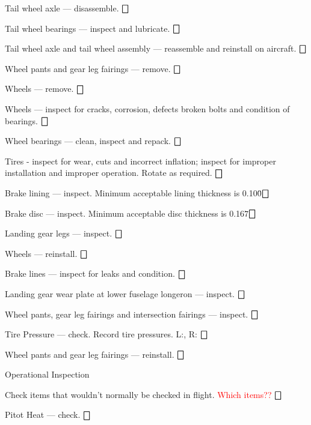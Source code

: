 \begin{enumerate*}
\begin{enumerate*}
\begin{enumerate*}
		  \item Tail wheel axle --- disassemble. \dotfill $\bigbox$
		  \item Tail wheel bearings --- inspect and lubricate. \dotfill $\bigbox$
		  \item Tail wheel axle and tail wheel assembly --- reassemble and reinstall on aircraft. \dotfill $\bigbox$
	  \end{enumerate*}
		\item Wheel pants and gear leg fairings --- remove. \dotfill $\bigbox$
		\item Wheels --- remove. \dotfill $\bigbox$
		\item Wheels --- inspect for cracks, corrosion, defects broken bolts and condition of bearings. \dotfill $\bigbox$
		\item Wheel bearings --- clean, inspect and repack. \dotfill $\bigbox$
		\item Tires - inspect for wear, cuts and incorrect inflation; inspect for improper installation and improper operation. Rotate as required. \dotfill $\bigbox$
		\item Brake lining --- inspect. Minimum acceptable lining thickness is 0.100\" \dotfill $\bigbox$
		\item Brake disc --- inspect. Minimum acceptable disc thickness is 0.167\" \dotfill $\bigbox$
		\item Landing gear legs --- inspect. \dotfill $\bigbox$
		\item Wheels --- reinstall. \dotfill $\bigbox$
		\item Brake lines --- inspect for leaks and condition. \dotfill $\bigbox$
		\item Landing gear wear plate at lower fuselage longeron --- inspect. \dotfill $\bigbox$
		\item Wheel pants, gear leg fairings and intersection fairings --- inspect. \dotfill $\bigbox$
		\item Tire Pressure --- check. Record tire pressures. L:\underline{\makebox[0.5in][l]{}}, R:\underline{\makebox[0.5in][l]{}} \dotfill $\bigbox$
		\item Wheel pants and gear leg fairings --- reinstall. \dotfill $\bigbox$
	\end{enumerate*}
	\item{Operational Inspection} 
	\begin{enumerate*}
		\item Check items that wouldn't normally be checked in flight. \textcolor{red}{Which items??} \dotfill $\bigbox$
		\item Pitot Heat --- check. \dotfill $\bigbox$

\end{enumerate*}
\end{enumerate*}
